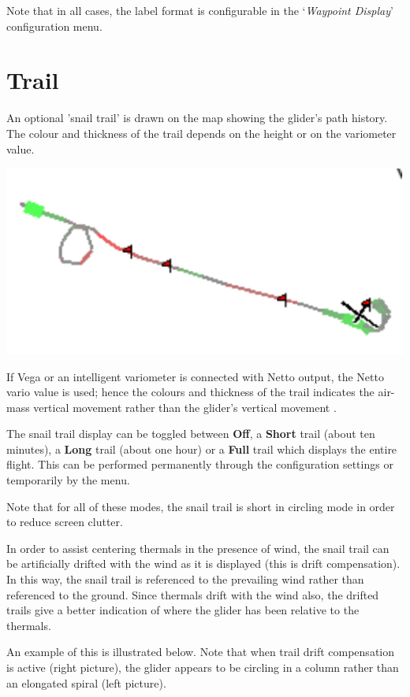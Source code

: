 Note that in all cases, the label format is configurable in the 
`{\it Waypoint Display}' configuration menu.  


\section{Trail}\label{sec:trail}

An optional 'snail trail' is drawn on the map showing the glider's
path history.  The colour and thickness of the trail depends on the height or
on the variometer value. 

\begin{center}
\includegraphics[angle=0,width=0.5\linewidth,keepaspectratio='true']{figures/snail.pdf}
\end{center}

If Vega or an intelligent variometer is connected with Netto output,
the Netto vario value is used; hence the colours and thickness of the
trail indicates the air-mass vertical movement rather than the glider's
vertical movement	.

The snail trail display can be toggled between {\bf Off}, a {\bf Short} trail
(about ten minutes), a {\bf Long} trail (about one hour) or a {\bf Full} trail
which displays the entire flight.  This can be performed permanently
through the configuration settings or temporarily by the
menu.

Note that for all of these modes, the snail trail is short in
circling mode in order to reduce screen clutter.

In order to assist centering thermals in the presence of wind, the
snail trail can be artificially drifted with the wind as it is
displayed (this is drift compensation).  In this way, the snail trail
is referenced to the prevailing wind rather than referenced to the
ground.  Since thermals drift with the wind also, the drifted trails
give a better indication of where the glider has been relative to the
thermals.

An example of this is illustrated below.  Note that when trail drift
compensation is active (right picture), the glider appears to be
circling in a column rather than an elongated spiral (left picture).

